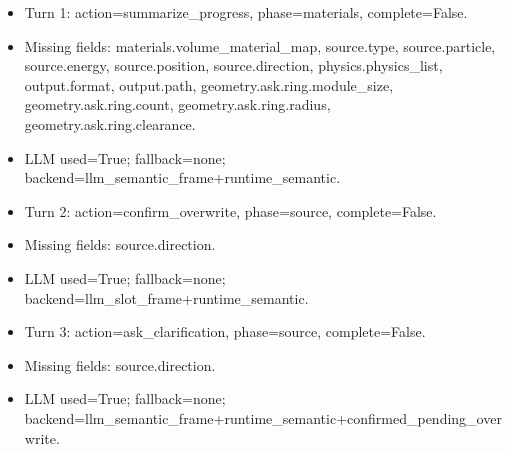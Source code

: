 \documentclass[11pt]{ctexart}
\begin{document}
\begin{itemize}
\item Turn 1: action=summarize\_progress, phase=materials, complete=False.
\item Missing fields: materials.volume\_material\_map, source.type, source.particle, source.energy, source.position, source.direction, physics.physics\_list, output.format, output.path, geometry.ask.ring.module\_size, geometry.ask.ring.count, geometry.ask.ring.radius, geometry.ask.ring.clearance.
\item LLM used=True; fallback=none; backend=llm\_semantic\_frame+runtime\_semantic.
\item Turn 2: action=confirm\_overwrite, phase=source, complete=False.
\item Missing fields: source.direction.
\item LLM used=True; fallback=none; backend=llm\_slot\_frame+runtime\_semantic.
\item Turn 3: action=ask\_clarification, phase=source, complete=False.
\item Missing fields: source.direction.
\item LLM used=True; fallback=none; backend=llm\_semantic\_frame+runtime\_semantic+confirmed\_pending\_overwrite.
\end{itemize}
\end{document}
